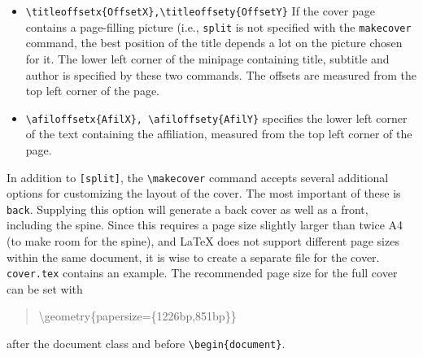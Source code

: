\begin{itemize}
\item\texttt{\textbackslash titleoffsetx\{OffsetX\},\textbackslash titleoffsety\{OffsetY\}}
    If the cover page contains a page-filling picture (i.e., \texttt{split} is not specified with the \texttt{makecover} command, the best position of the title depends a lot on the picture chosen for it. The lower left corner of the minipage containing title, subtitle and author is 
    specified by these two commands. The offsets are measured from the top left corner of the page. 
\item\texttt{\textbackslash afiloffsetx\{AfilX\}, \textbackslash afiloffsety\{AfilY\}}
    specifies the lower left corner of the text containing the affiliation, measured from the top left corner of the page. 
\end{itemize}

In addition to \texttt{[split]}, the \texttt{\textbackslash makecover} command accepts several additional options for customizing the layout of the cover. 
The most important of these is \texttt{back}. Supplying this option will generate a back cover as well as a front, including the spine. Since this requires a page size slightly larger than twice A4 (to make room for the spine), and \LaTeX{} does not support different page sizes within the same document, it is wise to create a separate file for the cover. \texttt{cover.tex} contains an example. The recommended page size for the full cover can be set with
\begin{quote}
    \textbackslash geometry\{papersize=\{1226bp,851bp\}\}
\end{quote}
after the document class and before \texttt{\textbackslash begin\{document\}}.

